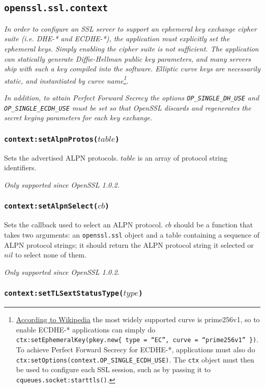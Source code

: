 \documentclass[11pt, oneside]{memoir}
\newcommand*{\fn}[1]{\texttt{#1}\xspace}
\newcommand*{\module}[1]{\texttt{#1}\xspace}
\newcounter{toccols}
\newenvironment{Module}[1]{
	\subsection{\texttt{#1}}
	\addtocontents{toc}{
		\protect\begin{multicols}{\value{toccols}}
	}
}{
	\addtocontents{toc}{\protect\end{multicols}}
}
\begin{document}
\begin{Module}{openssl.ssl.context}
\emph{In order to configure an SSL server to support an ephemeral key exchange cipher suite (i.e. DHE-* and ECDHE-*), the application must explicitly set the ephemeral keys. Simply enabling the cipher suite is not sufficient. The application can statically generate Diffie-Hellman public key parameters, and many servers ship with such a key compiled into the software. Elliptic curve keys are necessarily static, and instantiated by curve name\footnote{\href{http://en.wikipedia.org/w/index.php?title=Comparison\_of\_TLS\_implementations&oldid=629779090\#Supported\_elliptic\_curves}{According to Wikipedia} the most widely supported curve is prime256v1, so to enable ECDHE-* applications can simply do \texttt{ctx:setEphemeralKey(pkey.new\{ type = ``EC'', curve = ``prime256v1'' \})}. To achieve Perfect Forward Secrecy for ECDHE-*, applications must also do \texttt{ctx:setOptions(context.OP\_SINGLE\_ECDH\_USE)}. The \texttt{ctx} object must then be used to configure each SSL session, such as by passing it to \fn{cqueues.socket:starttls()}.}.}

\emph{In addition, to attain Perfect Forward Secrecy the options \texttt{OP\_SINGLE\_DH\_USE} and \texttt{OP\_SINGLE\_ECDH\_USE} must be set so that OpenSSL discards and regenerates the secret keying parameters for each key exchange.}

\subsubsection[\fn{context:setAlpnProtos}]{\fn{context:setAlpnProtos($table$)}}

Sets the advertised ALPN protocols. $table$ is an array of protocol string identifiers.

\emph{Only supported since OpenSSL 1.0.2.}

\subsubsection[\fn{context:setAlpnSelect}]{\fn{context:setAlpnSelect($cb$)}}

Sets the callback used to select an ALPN protocol. $cb$ should be a function that takes two arguments: an \module{openssl.ssl} object and a table containing a sequence of ALPN protocol strings; it should return the ALPN protocol string it selected or $nil$ to select none of them.

\emph{Only supported since OpenSSL 1.0.2.}

\subsubsection[\fn{context:setTLSextStatusType}]{\fn{context:setTLSextStatusType($type$)}}


\end{Module}
\end{document}
